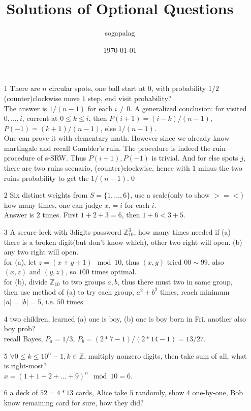 \documentclass[paper=a4, fontsize=11pt]{scrartcl} %
\title{Solutions of Optional Questions}
\author{sogapalag}
\date{\normalsize\today}
\numberwithin{equation}{section} %
\numberwithin{figure}{section} %
\numberwithin{table}{section} %
\begin{document}
\maketitle

\begin{itemize}
	\item[1] There are $n$ circular spots, one ball start at $0$, with probability $1/2$ (counter)clockwise move $1$ step, end visit probability?\\
	The answer is $1/(n-1)$ for each $i\neq 0$. A generalized conclusion: for visited $0,...,i$, current at $0\leq k\leq i$, then $P(i+1)= (i-k)/(n-1)$, $P(-1)= (k+1)/(n-1)$, else $1/(n-1)$.\\
	One can prove it with elementary math. However since we already know martingale and recall Gambler's ruin. The procedure is indeed the ruin procedure of s-SRW. Thus $P(i+1),P(-1)$ is trivial. And for else spots $j$, there are two ruins scenario, (counter)clockwise, hence with $1$ minus the two ruins probability to get the $1/(n-1)$.\qed
	\item[2] Six distinct weights from $S=\{1,...,6\}$, use a scale(only to show $>=<$) how many times, one can judge $x_i=i$ for each $i$.\\
	Answer is $2$ times. First $1+2+3=6$, then $1+6<3+5$.
	\item[3] A secure lock with $3$digits password $\mathbb{Z}_{10}^3$, how many times needed if (a) there is a broken digit(but don't know which), other two right will open. (b) any two right will open.\\
	for (a), let $z = (x+y+1)\mod 10$, thus $(x,y)$ tried $00\sim 99$, also $(x,z)$ and $(y,z)$, so $100$ times optimal.\\
	for (b), divide $\mathbb{Z}_{10}$ to two groups $a,b$, thus there must two in same group, then use method of (a) to try each group, $a^2+b^2$ times, reach minimum $|a|=|b|=5$, i.e. $50$ times.
	\item[4] two children, learned (a) one is boy, (b) one is boy born in Fri. another also boy prob?\\
	recall Bayes, $P_a = 1/3$, $P_b=(2*7-1)/(2*14-1)= 13/27$.
	\item[5] $\forall 0\leq k\leq 10^n-1, k\in\mathbb{Z}$, multiply nonzero digits, then take sum of all, what is right-most?\\
	$x=(1+1+2+\dots+9)^n \mod 10 = 6$.
	\item[6] a deck of $52=4*13$ cards, Alice take $5$ randomly, show $4$ one-by-one, Bob know remaining card for sure, how they did?\\

\end{itemize}
\end{document}
